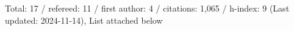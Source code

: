 Total: 17 / refereed: 11 / first author: 4 / citations: 1,065 / h-index: 9 (Last updated: 2024-11-14), List attached below